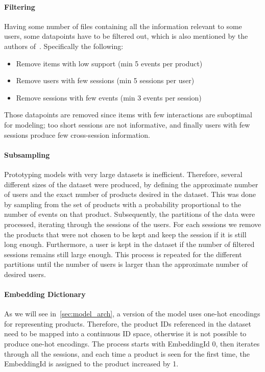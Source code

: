 \paragraph{Filtering}
Having some number of files containing all the information relevant to some users, some datapoints have to be filtered out, which is also mentioned by the authors of~\cite{hierarchical}.
Specifically the following:
\begin{itemize}
    \item Remove items with low support (min 5 events per product)
    \item Remove users with few sessions (min 5 sessions per user)
    \item Remove sessions with few events (min 3 events per session)
\end{itemize}
Those datapoints are removed since items with few interactions are suboptimal for modeling; too short sessions are not informative, and finally users with few sessions produce few cross-session information.

\paragraph{Subsampling}
Prototyping models with very large datasets is inefficient.
Therefore, several different sizes of the dataset were produced, by defining the approximate number of users and the exact number of products desired in the dataset.
This was done by sampling from the set of products with a probability proportional to the number of events on that product.
Subsequently, the partitions of the data were processed, iterating through the sessions of the users.
For each sessions we remove the products that were not chosen to be kept and keep the session if it is still long enough.
Furthermore, a user is kept in the dataset if the number of filtered sessions remains still large enough.
This process is repeated for the different partitions until the number of users is larger than the approximate number of desired users.

\paragraph{Embedding Dictionary}\label{sec:embedding_dict}
As we will see in~\ref{sec:model_arch}, a version of the model uses one-hot encodings for representing products.
Therefore, the product IDs referenced in the dataset need to be mapped into a continuous ID space, otherwise it is not possible to produce one-hot encodings.
The process starts with EmbeddingId 0, then iterates through all the sessions, and each time a product is seen for the first time, the EmbeddingId is assigned to the product increased by 1.

